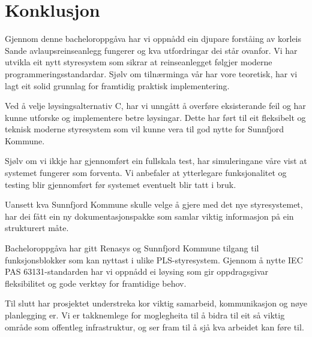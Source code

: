 \chapter{Konklusjon}
\thispagestyle{fancy}

Gjennom denne bacheloroppgåva har vi oppnådd ein djupare forståing av korleis Sande avlaupsreinseanlegg fungerer og kva utfordringar dei står ovanfor. 
Vi har utvikla eit nytt styresystem som sikrar at reinseanlegget følgjer moderne programmeringsstandardar. 
Sjølv om tilnærminga vår har vore teoretisk, har vi lagt eit solid grunnlag for framtidig praktisk implementering.

Ved å velje løysingsalternativ C, har vi unngått å overføre eksisterande feil og har kunne utforske og implementere betre løysingar. 
Dette har ført til eit fleksibelt og teknisk moderne styresystem som vil kunne vera til god nytte for \gls{Sunnfjord Kommune}.

Sjølv om vi ikkje har gjennomført ein fullskala test, har simuleringane våre vist at systemet fungerer som forventa. 
Vi anbefaler at ytterlegare funksjonalitet og testing blir gjennomført før systemet eventuelt blir tatt i bruk.

Uansett kva \gls{Sunnfjord Kommune} skulle velge å gjere med det nye styresystemet, har dei fått ein ny dokumentasjonspakke 
som samlar viktig informasjon på ein strukturert måte.

Bacheloroppgåva har gitt \gls{Renasys} og \gls{Sunnfjord Kommune} tilgang til funksjonsblokker som kan nyttast i ulike PLS-styresystem. 
Gjennom å nytte \gls{IEC} \gls{PAS} 63131-standarden har vi oppnådd ei løysing som gir oppdragsgivar fleksibilitet og gode verktøy for framtidige behov.

Til slutt har prosjektet understreka kor viktig samarbeid, kommunikasjon og nøye planlegging er.
Vi er takknemlege for moglegheita til å bidra til eit så viktig område som offentleg infrastruktur, og ser fram til å sjå kva arbeidet kan føre til.

